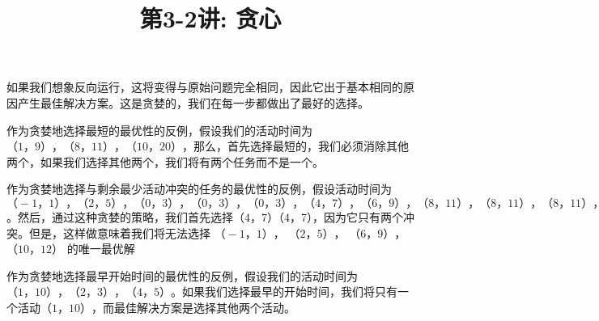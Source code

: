 \documentclass[a4paper, justified]{tufte-handout}
\title{第3-2讲: 贪心}
\date{\zhtoday} %
\begin{document}
\maketitle
\noplagiarism %
\begin{abstract}
\end{abstract}
\beginrequired

\begin{problem}[TC 16.1-2]
\end{problem}

\begin{solution}
	如果我们想象反向运行，这将变得与原始问题完全相同，因此它出于基本相同的原因产生最佳解决方案。这是贪婪的，我们在每一步都做出了最好的选择。
\end{solution}

\begin{problem}[TC 16.1-3]
\end{problem}

\begin{solution}


	作为贪婪地选择最短的最优性的反例，假设我们的活动时间为${（1， 9）， （8， 11）， （10， 20）}$，那么，首先选择最短的，我们必须消除其他两个，如果我们选择其他两个，我们将有两个任务而不是一个。


	作为贪婪地选择与剩余最少活动冲突的任务的最优性的反例，假设活动时间为 ${（−1， 1）， （2， 5）， （0， 3）， （0， 3）， （0， 3）， （4， 7）， （6， 9）， （8， 11）， （8， 11）， （8， 11）， （10， 12）}$。然后，通过这种贪婪的策略，我们首先选择（4，7）（4，7），因为它只有两个冲突。但是，这样做意味着我们将无法选择 $（−1， 1）$， $（2， 5）$， $（6， 9）$， $（10， 12）$ 的唯一最优解


	作为贪婪地选择最早开始时间的最优性的反例，假设我们的活动时间为 ${（1， 10）， （2， 3）， （4， 5）}$。如果我们选择最早的开始时间，我们将只有一个活动$（1， 10）$，而最佳解决方案是选择其他两个活动。
\end{solution}

\begin{problem}[TC 16.2-1]
\end{problem}
\end{document}
